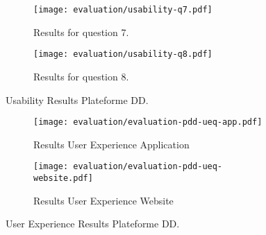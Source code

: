 \begin{figure}[H]\ContinuedFloat
	\centering
	\begin{subfigure}{.8\textwidth}
  		\centering
  		\texttt{[image: evaluation/usability-q7.pdf]}
  		\caption{Results for question 7.}
	\end{subfigure}\par\bigskip
	
	\begin{subfigure}{.8\textwidth}
  		\centering
  		\texttt{[image: evaluation/usability-q8.pdf]}
  		\caption{Results for question 8.}
	\end{subfigure}
	\caption{Usability Results Plateforme DD.}
	\label{fig:evaluation-pdd-usability}
\end{figure}

\begin{figure}[H]
	\centering
	\begin{subfigure}{.49\textwidth}
  		\centering
  		\texttt{[image: evaluation/evaluation-pdd-ueq-app.pdf]}
  		\caption{Results User Experience Application}
	\end{subfigure}%
	\begin{subfigure}{.49\textwidth}
  		\centering
  		\texttt{[image: evaluation/evaluation-pdd-ueq-website.pdf]}
  		\caption{Results User Experience Website}
	\end{subfigure}
	\caption{User Experience Results Plateforme DD.}
	\label{fig:evaluation-pdd-ueq}
\end{figure}



